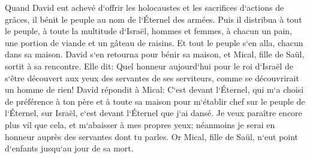 \verse Quand David eut achevé d`offrir les holocaustes et les sacrifices d`actions de grâces, il bénit le peuple au nom de l`Éternel des armées. 
\verse Puis il distribua à tout le peuple, à toute la multitude d`Israël, hommes et femmes, à chacun un pain, une portion de viande et un gâteau de raisins. Et tout le peuple s`en alla, chacun dans sa maison. 
\verse David s`en retourna pour bénir sa maison, et Mical, fille de Saül, sortit à sa rencontre. Elle dit: Quel honneur aujourd`hui pour le roi d`Israël de s`être découvert aux yeux des servantes de ses serviteurs, comme se découvrirait un homme de rien! 
\verse David répondit à Mical: C`est devant l`Éternel, qui m`a choisi de préférence à ton père et à toute sa maison pour m`établir chef sur le peuple de l`Éternel, sur Israël, c`est devant l`Éternel que j`ai dansé. 
\verse Je veux paraître encore plus vil que cela, et m`abaisser à mes propres yeux; néanmoins je serai en honneur auprès des servantes dont tu parles. 
\verse Or Mical, fille de Saül, n`eut point d`enfants jusqu`au jour de sa mort. 

\chapter{}

